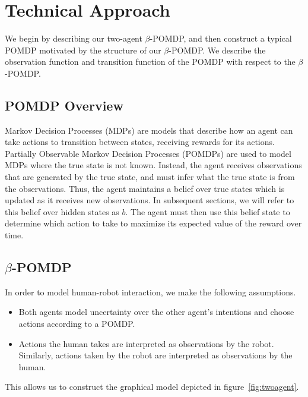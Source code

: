 \documentclass[conference]{IEEEtran}
\begin{document}
\section{Technical Approach}

We begin by describing our two-agent $\beta$-POMDP, and then construct a typical POMDP motivated by the structure of our $\beta$-POMDP. We describe the observation function and transition function of the POMDP with respect to the $\beta$-POMDP. 

\subsection{POMDP Overview}

Markov Decision Processes (MDPs)\cite{Bel} are models that describe how an agent can take actions to transition between states, receiving rewards for its actions. Partially Observable Markov Decision Processes (POMDPs) are used to model MDPs where the true state is not known. Instead, the agent receives observations that are generated by the true state, and must infer what the true state is from the observations. Thus, the agent maintains a belief over true states which is updated as it receives new observations. In subsequent sections, we will refer to this belief over hidden states as $b$. The agent must then use this belief state to determine which action to take to maximize its expected value of the reward over time. 


\subsection{$\beta$-POMDP}

In order to model human-robot interaction, we make the following assumptions. 

\begin{itemize}
	\item Both agents model uncertainty over the other agent's intentions and choose actions according to a POMDP.
	\item Actions the human takes are interpreted as observations by the robot. Similarly, actions taken by the robot are interpreted as observations by the human. 
\end{itemize}

This allows us to construct the graphical model depicted in figure~\ref{fig:twoagent}. 
\end{document}
